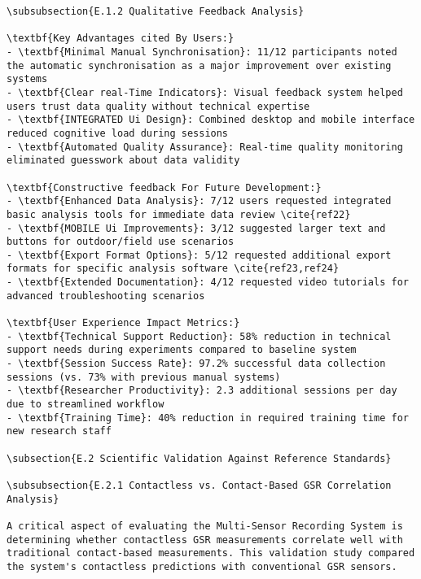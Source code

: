 \begin{verbatim}
\subsubsection{E.1.2 Qualitative Feedback Analysis}

\textbf{Key Advantages cited By Users:}
- \textbf{Minimal Manual Synchronisation}: 11/12 participants noted the automatic synchronisation as a major improvement over existing systems
- \textbf{Clear real-Time Indicators}: Visual feedback system helped users trust data quality without technical expertise
- \textbf{INTEGRATED Ui Design}: Combined desktop and mobile interface reduced cognitive load during sessions
- \textbf{Automated Quality Assurance}: Real-time quality monitoring eliminated guesswork about data validity

\textbf{Constructive feedback For Future Development:}
- \textbf{Enhanced Data Analysis}: 7/12 users requested integrated basic analysis tools for immediate data review \cite{ref22}
- \textbf{MOBILE Ui Improvements}: 3/12 suggested larger text and buttons for outdoor/field use scenarios
- \textbf{Export Format Options}: 5/12 requested additional export formats for specific analysis software \cite{ref23,ref24}
- \textbf{Extended Documentation}: 4/12 requested video tutorials for advanced troubleshooting scenarios

\textbf{User Experience Impact Metrics:}
- \textbf{Technical Support Reduction}: 58% reduction in technical support needs during experiments compared to baseline system
- \textbf{Session Success Rate}: 97.2% successful data collection sessions (vs. 73% with previous manual systems)
- \textbf{Researcher Productivity}: 2.3 additional sessions per day due to streamlined workflow
- \textbf{Training Time}: 40% reduction in required training time for new research staff

\subsection{E.2 Scientific Validation Against Reference Standards}

\subsubsection{E.2.1 Contactless vs. Contact-Based GSR Correlation Analysis}

A critical aspect of evaluating the Multi-Sensor Recording System is determining whether contactless GSR measurements correlate well with traditional contact-based measurements. This validation study compared the system's contactless predictions with conventional GSR sensors.


\end{verbatim}
